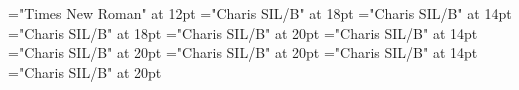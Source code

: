 \documentclass[a4paper]{article}
\begin{document}
 
\pagestyle{plain} 
\font\scrBookscrBody="Times New Roman" at 12pt
\font\TitleMainscrBookscrBody="Charis SIL/B" at 18pt
\font\TitleSecondarynkoTitleMainscrBookscrBody="Charis SIL/B" at 14pt
\font\spannkoTitleMainscrBookscrBody="Charis SIL/B" at 18pt
\font\TitleMainNonescrBookscrBody="Charis SIL/B" at 20pt
\font\TitleSecondarynkoTitleMainNonescrBookscrBody="Charis SIL/B" at 14pt
\font\spannkoTitleMainNonescrBookscrBody="Charis SIL/B" at 20pt
\font\TitleMainNormalscrBookscrBody="Charis SIL/B" at 20pt
\font\TitleSecondarynkoTitleMainNormalscrBookscrBody="Charis SIL/B" at 14pt
\font\spannkoTitleMainNormalscrBookscrBody="Charis SIL/B" at 20pt

\pagestyle{fancy} 
\begin{adjustwidth}{36pt}{0pt}{12pt}{0pt}\begin{spacing}{1}\begin{center}


\end{center}\end{spacing}\end{adjustwidth} \begin{adjustwidth}{36pt}{0pt}{12pt}{0pt}\begin{center}


\end{center}\end{adjustwidth} \begin{adjustwidth}{36pt}{0pt}{12pt}{0pt}\begin{spacing}{1.5}\begin{center}


\end{center}\end{spacing}\end{adjustwidth} 
\end{document}
